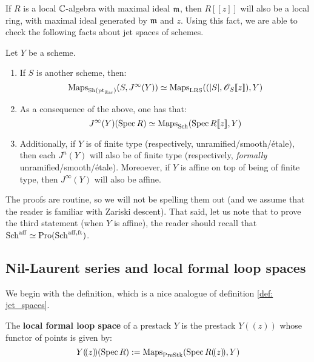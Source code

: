         If $R$ is a local $\mathbb{C}$-algebra with maximal ideal $\mathfrak{m}$, then $R[\![z]\!]$ will also be a local ring, with maximal ideal generated by $\mathfrak{m}$ and $z$. Using this fact, we are able to check the following facts about jet spaces of schemes. 
        \begin{lemma} \label{lemma: basic_properties_of_jet_spaces}
            Let $Y$ be a scheme.
            \begin{enumerate}
                \item If $S$ is another scheme, then:
                    $$\operatorname{Maps}_{\mathrm{Sh}( \mathrm{pt}_{\mathrm{Zar}} )}( S, J^{\infty}(Y) ) \simeq \operatorname{Maps}_{\mathrm{LRS}}( (|S|, \mathscr{O}_S[\![z]\!]), Y )$$
                \item As a consequence of the above, one has that:
                    $$J^{\infty}(Y)(\operatorname{Spec} R) \simeq \operatorname{Maps}_{\mathrm{Sch}}(\operatorname{Spec} R[\![z]\!], Y)$$
                \item Additionally, if $Y$ is of finite type (respectively, unramified/smooth/\'etale), then each $J^n(Y)$ will also be of finite type (respectively, \textit{formally} unramified/smooth/\'etale). Moreoever, if $Y$ is affine on top of being of finite type, then $J^{\infty}(Y)$ will also be affine.
            \end{enumerate}
        \end{lemma}
        The proofs are routine, so we will not be spelling them out (and we assume that the reader is familiar with Zariski descent). That said, let us note that to prove the third statement (when $Y$ is affine), the reader should recall that $\mathrm{Sch}^{\mathrm{aff}} \simeq \mathrm{Pro}(\mathrm{Sch}^{\mathrm{aff}, \mathrm{ft}})$.

        \begin{lemma} \label{lemma: gluing_jet_spaces}
            
        \end{lemma}

    \subsection{Nil-Laurent series and local formal loop spaces}
        We begin with the definition, which is a nice analogue of definition \ref{def: jet_spaces}.
        \begin{definition} \label{def: local_formal_loop_spaces}
            The \textbf{local formal loop space} of a prestack $Y$ is the prestack $Y(\!(z)\!)$ whose functor of points is given by:
                $$Y(\!(z)\!)(\operatorname{Spec} R) := \operatorname{Maps}_{\mathrm{Pre}\mathrm{Stk}}(\operatorname{Spec} R(\!(z)\!), Y)$$
        \end{definition}
    
